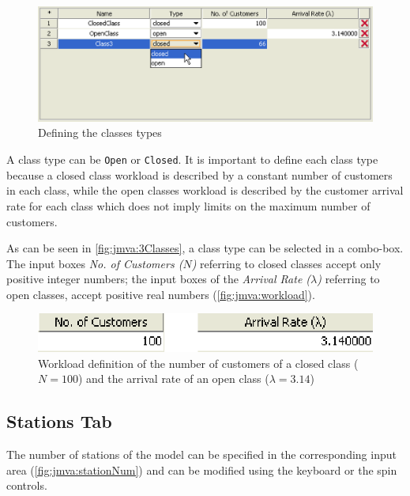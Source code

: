 \begin{figure}[htbp]
    \begin{center}
        \includegraphics[scale=.5]{img/jmva/3classes}
    \end{center}
    \caption{Defining the classes types}
    \label{fig:jmva:3Classes}
\end{figure}

A class type can be \texttt{Open} or \texttt{Closed}. It is
important to define each class type because a closed class workload
is described by a constant number of customers in each class, while the open
classes workload is described by the customer arrival rate for each
class which does not imply limits on the maximum number of customers.

As can be seen in \autoref{fig:jmva:3Classes}, a class type can be
selected in a combo-box. The input boxes \emph{No. of Customers
($N$)} referring to closed classes accept only positive integer
numbers; the input boxes of the \emph{Arrival Rate ($\lambda$)}
referring to open classes, accept positive real numbers
(\autoref{fig:jmva:workload}).

\begin{figure}[htbp]
    \begin{center}
        \includegraphics[scale=.5]{img/jmva/NL}
    \end{center}
    \caption{Workload definition of the number of customers of a closed
    class ($N=100$) and the arrival rate of an open class ($\lambda=3.14$)}
    \label{fig:jmva:workload}
\end{figure}

\subsection{Stations Tab}
The number of stations of the model can be specified in the
corresponding input area (\autoref{fig:jmva:stationNum}) and can be
modified using the keyboard or the spin controls.

